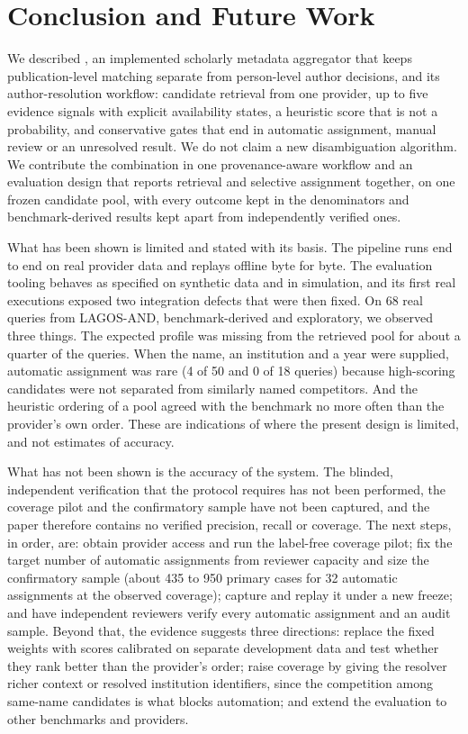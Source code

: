 \section{Conclusion and Future Work}
\label{sec:conclusion}
We described \hammer{}, an implemented scholarly metadata aggregator that keeps publication-level matching separate from person-level author decisions, and its author-resolution workflow: candidate retrieval from one provider, up to five evidence signals with explicit availability states, a heuristic score that is not a probability, and conservative gates that end in automatic assignment, manual review or an unresolved result. We do not claim a new disambiguation algorithm. We contribute the combination in one provenance-aware workflow and an evaluation design that reports retrieval and selective assignment together, on one frozen candidate pool, with every outcome kept in the denominators and benchmark-derived results kept apart from independently verified ones.

What has been shown is limited and stated with its basis. The pipeline runs end to end on real provider data and replays offline byte for byte. The evaluation tooling behaves as specified on synthetic data and in simulation, and its first real executions exposed two integration defects that were then fixed. On 68 real queries from LAGOS-AND, benchmark-derived and exploratory, we observed three things. The expected profile was missing from the retrieved pool for about a quarter of the queries. When the name, an institution and a year were supplied, automatic assignment was rare (4 of 50 and 0 of 18 queries) because high-scoring candidates were not separated from similarly named competitors. And the heuristic ordering of a pool agreed with the benchmark no more often than the provider's own order. These are indications of where the present design is limited, and not estimates of accuracy.

What has not been shown is the accuracy of the system. The blinded, independent verification that the protocol requires has not been performed, the coverage pilot and the confirmatory sample have not been captured, and the paper therefore contains no verified precision, recall or coverage. The next steps, in order, are: obtain provider access and run the label-free coverage pilot; fix the target number of automatic assignments from reviewer capacity and size the confirmatory sample (about 435 to 950 primary cases for 32 automatic assignments at the observed coverage); capture and replay it under a new freeze; and have independent reviewers verify every automatic assignment and an audit sample. Beyond that, the evidence suggests three directions: replace the fixed weights with scores calibrated on separate development data and test whether they rank better than the provider's order; raise coverage by giving the resolver richer context or resolved institution identifiers, since the competition among same-name candidates is what blocks automation; and extend the evaluation to other benchmarks and providers.
